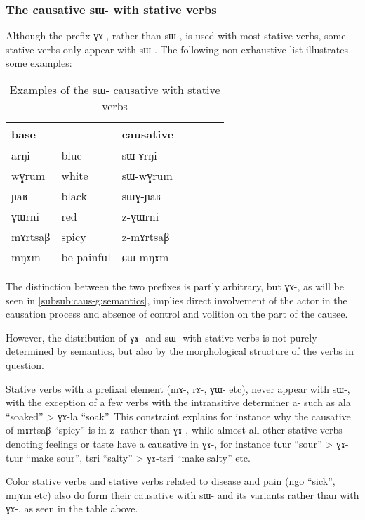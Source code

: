 \documentclass[oldfontcommands,oneside,a4paper,11pt]{memoir}
\newcommand{\ipa}[1]{{\phon #1}} %
\begin{document}
 \subsubsection{The causative \ipa{sɯ-} with stative verbs} \label{subsub:caus.sW.stative}
 Although the prefix \ipa{ɣɤ-}, rather than \ipa{sɯ-}, is used with most stative verbs, some stative verbs only appear with \ipa{sɯ-}. The following non-exhaustive list illustrates some examples:
 \begin{table}[H]
\caption{Examples of the \ipa{sɯ}- causative with stative verbs }\label{tab:causative.sW.stative}
\begin{tabular}{lllllll} \toprule
  base  & &causative  \\
\midrule
   \ipa{arŋi} & blue & \ipa{sɯ-ɤrŋi} \\
 \ipa{wɣrum} & white & \ipa{sɯ-wɣrum} \\
 \ipa{ɲaʁ} & black & \ipa{sɯɣ-ɲaʁ} \\
  \ipa{ɣɯrni} & red & \ipa{z-ɣɯrni} \\
    \ipa{mɤrtsaβ} & spicy & \ipa{z-mɤrtsaβ} \\
       \ipa{mŋɤm} & be painful & \ipa{ɕɯ-mŋɤm} \\
\bottomrule
\end{tabular}
\end{table}
   The distinction between the two prefixes is partly arbitrary, but \ipa{ɣɤ-}, as will be seen in  \ref{subsub:caus-g:semantics}, implies  direct involvement of the actor in the causation process  and absence of control and volition on the part of the causee. 
   
   However, the distribution of  \ipa{ɣɤ-} and \ipa{sɯ-} with stative verbs is not purely determined by semantics, but also by the morphological structure of the verbs in question. 
   
    Stative verbs with a prefixal element (\ipa{mɤ-}, \ipa{rɤ-}, \ipa{ɣɯ-} etc), never appear with \ipa{sɯ-}, with the exception of a few verbs with the intransitive determiner \ipa{a-} such as \ipa{ala}  ``soaked'' > \ipa{ɣɤ-la}  ``soak''. This constraint explains for instance why the causative of \ipa{mɤrtsaβ}  ``spicy'' is  in \ipa{z-} rather than \ipa{ɣɤ-}, while almost all other stative verbs denoting feelings or taste have a causative in \ipa{ɣɤ-}, for instance \ipa{tɕur}  ``sour'' > \ipa{ɣɤ-tɕur}  ``make   sour'',   \ipa{tsri}  ``salty'' > \ipa{ɣɤ-tsri}  ``make   salty'' etc.  
  
Color stative verbs and stative verbs related to disease and pain (\ipa{ngo} ``sick'', \ipa{mŋɤm} etc) also do  form their causative with \ipa{sɯ-} and its variants rather than with \ipa{ɣɤ-}, as seen in the table above.
  
\end{document}
